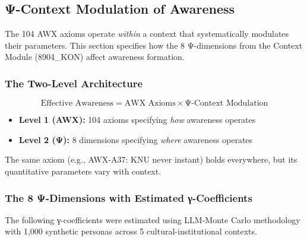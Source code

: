 \subsection{Ψ-Context Modulation of Awareness}
\label{subsec:11-15-psi-modulation}


The 104 AWX axioms operate \emph{within} a context that systematically modulates their parameters. This section specifies how the 8 Ψ-dimensions from the Context Module (8904\_KON) affect awareness formation.

\subsubsection{The Two-Level Architecture}

\begin{equation}
\boxed{\text{Effective Awareness} = \text{AWX Axioms} \times \text{Ψ-Context Modulation}}
\end{equation}

\begin{itemize}
    \item \textbf{Level 1 (AWX):} 104 axioms specifying \emph{how} awareness operates
    \item \textbf{Level 2 (Ψ):} 8 dimensions specifying \emph{where} awareness operates
\end{itemize}

The same axiom (e.g., AWX-A37: KNU never instant) holds everywhere, but its quantitative parameters vary with context.

\subsubsection{The 8 Ψ-Dimensions with Estimated γ-Coefficients}

The following γ-coefficients were estimated using LLM-Monte Carlo methodology with 1,000 synthetic personas across 5 cultural-institutional contexts.

